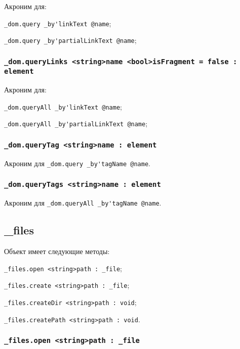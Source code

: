 Акроним для:
\begin{icItems}
	\item \lstinline|_dom.query _by'linkText @name|;
	\item \lstinline|_dom.query _by'partialLinkText @name|;
\end{icItems}

\subsubsection{\lstinline|_dom.queryLinks <string>name <bool>isFragment = false : element|}

Акроним для:
\begin{icItems}
	\item \lstinline|_dom.queryAll _by'linkText @name|;
	\item \lstinline|_dom.queryAll _by'partialLinkText @name|;
\end{icItems}

\subsubsection{\lstinline|_dom.queryTag <string>name : element|}

Акроним для \lstinline|_dom.query _by'tagName @name|.

\subsubsection{\lstinline|_dom.queryTags <string>name : element|}

Акроним для \lstinline|_dom.queryAll _by'tagName @name|.

\subsection{{\color{orange} \_files}}

Объект \files{} имеет следующие методы:
\begin{icItems}
	\item \lstinline|_files.open <string>path : _file|;
	\item \lstinline|_files.create <string>path : _file|;
	\item \lstinline|_files.createDir <string>path : void|;
	\item \lstinline|_files.createPath <string>path : void|.
\end{icItems}

\subsubsection{\lstinline|_files.open <string>path : _file|}

